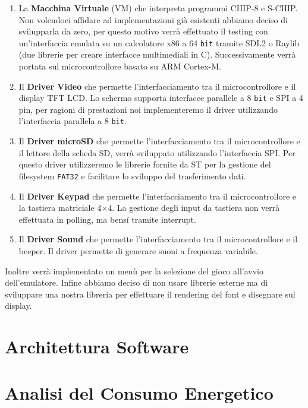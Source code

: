 \documentclass[a4paper]{article}
\begin{document}
\begin{enumerate}
	\item La \textbf{Macchina Virtuale} (VM) che interpreta programmi CHIP-8 e S-CHIP. Non volendoci affidare ad implementazioni già esistenti abbiamo deciso di svilupparla da zero, per questo motivo verrà effettuato il testing con un'interfaccia emulata su un calcolatore \textrm{x}86 a 64 \texttt{bit} tramite SDL2 o Raylib (due librerie per creare interfacce multimediali in C). Successivamente verrà portata sul microcontrollore basato su ARM Cortex-M.
	\item Il \textbf{Driver Video} che permette l'interfacciamento tra il microcontrollore e il display TFT LCD. Lo schermo supporta interfacce parallele a 8 \texttt{bit} e SPI a 4 pin, per ragioni di prestazioni noi implementeremo il driver utilizzando l'interfaccia parallela a 8 \texttt{bit}.
	\item Il \textbf{Driver microSD} che permette l'interfacciamento tra il microcontrollore e il lettore della scheda SD, verrà sviluppato utilizzando l'interfaccia SPI. Per questo driver utilizzeremo le librerie fornite da ST per la gestione del filesystem \texttt{FAT32} e facilitare lo sviluppo del trasferimento dati.
	\item Il \textbf{Driver Keypad} che permette l'interfacciamento tra il microcontrollore e la tastiera matriciale 4$\times$4. La gestione degli input da tastiera non verrà effettuata in polling, ma bens\'{i} tramite interrupt.
	\item Il \textbf{Driver Sound} che permette l'interfacciamento tra il microcontrollore e il beeper. Il driver permette di generare suoni a frequenza variabile.
\end{enumerate}

Inoltre verrà implementato un menù per la selezione del gioco all'avvio dell'emulatore. Infine abbiamo deciso di non usare librerie esterne ma di sviluppare una nostra libreria per effettuare il rendering del font e disegnare sul display.

\section{Architettura Software}

\section{Analisi del Consumo Energetico}
\end{document}
